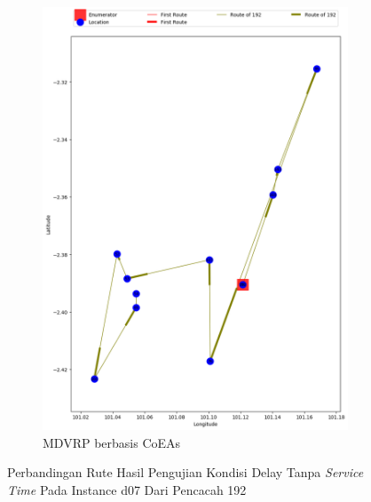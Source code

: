 \begin{figure}[H]
	\centering
	\begin{subfigure}[t]{\textwidth}
		\centering
		\includegraphics[width=\textwidth]{Resources/Images/delayed_7/real_m15_n100_delayed_7_192_coes}
		\caption{MDVRP berbasis CoEAs}
		\label{fig:real_m15_n100_delayed_7_192_coes}
	\end{subfigure}
	\caption{Perbandingan Rute Hasil Pengujian Kondisi Delay Tanpa \textit{Service Time} Pada Instance d07 Dari Pencacah 192}
	\label{fig:real_m15_n100_delayed_7_192}
\end{figure}


